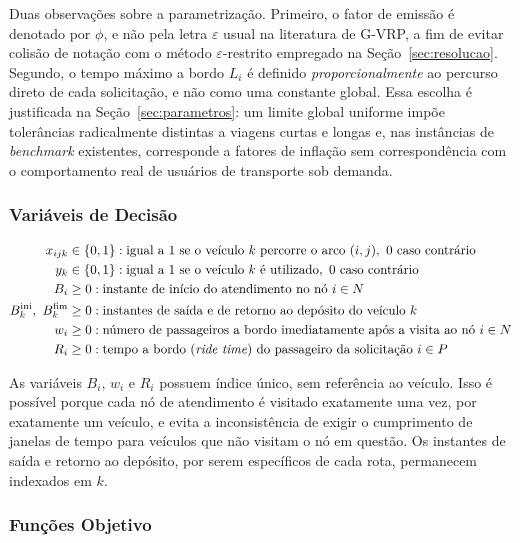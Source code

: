 \documentclass[12pt,a4paper]{article}
\theoremstyle{plain}
\begin{document}
Duas observações sobre a parametrização. Primeiro, o fator de emissão é denotado por $\phi$, e não pela letra $\varepsilon$ usual na literatura de G-VRP, a fim de evitar colisão de notação com o método $\varepsilon$-restrito empregado na Seção~\ref{sec:resolucao}. Segundo, o tempo máximo a bordo $L_i$ é definido \textit{proporcionalmente} ao percurso direto de cada solicitação, e não como uma constante global. Essa escolha é justificada na Seção~\ref{sec:parametros}: um limite global uniforme impõe tolerâncias radicalmente distintas a viagens curtas e longas e, nas instâncias de \textit{benchmark} existentes, corresponde a fatores de inflação sem correspondência com o comportamento real de usuários de transporte sob demanda.

\subsubsection{Variáveis de Decisão}

\begin{align}
x_{ijk} &\in \{0,1\}: \text{igual a 1 se o veículo } k \text{ percorre o arco } (i,j),\ 0 \text{ caso contrário} \\
y_{k}   &\in \{0,1\}: \text{igual a 1 se o veículo } k \text{ é utilizado},\ 0 \text{ caso contrário} \\
B_{i}   &\geq 0: \text{instante de início do atendimento no nó } i \in N \\
B^{\text{ini}}_{k},\ B^{\text{fim}}_{k} &\geq 0: \text{instantes de saída e de retorno ao depósito do veículo } k \\
w_{i}   &\geq 0: \text{número de passageiros a bordo imediatamente após a visita ao nó } i \in N \\
R_{i}   &\geq 0: \text{tempo a bordo (\textit{ride time}) do passageiro da solicitação } i \in P
\end{align}

As variáveis $B_i$, $w_i$ e $R_i$ possuem índice único, sem referência ao veículo. Isso é possível porque cada nó de atendimento é visitado exatamente uma vez, por exatamente um veículo, e evita a inconsistência de exigir o cumprimento de janelas de tempo para veículos que não visitam o nó em questão. Os instantes de saída e retorno ao depósito, por serem específicos de cada rota, permanecem indexados em $k$.

\subsubsection{Funções Objetivo}
\end{document}
